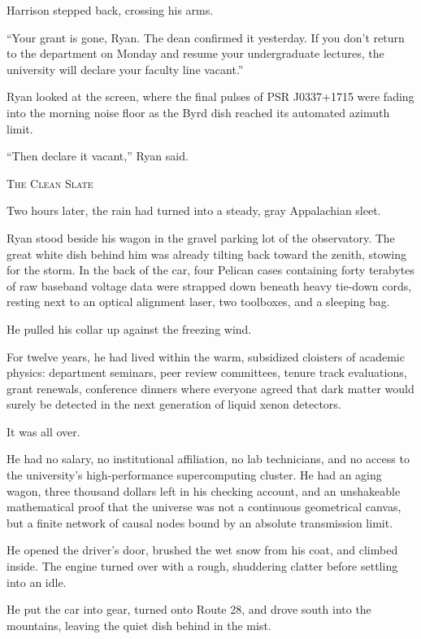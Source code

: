 \documentclass[12pt,twoside,openright]{book}
\newcommand{\sceneheader}[1]{%
  \par\vspace{1.8em}%
  {\noindent\centering\scshape\large #1\par}%
  \vspace{1.0em}%
  \noindent%
}
\newcommand{\dinkus}{%
  \par\vspace{1.2em}%
  {\noindent\centering{\large $\ast\quad\ast\quad\ast$}\par}%
  \vspace{1.2em}%
  \noindent%
}
\begin{document}
Harrison stepped back, crossing his arms.

``Your grant is gone, Ryan. The dean confirmed it yesterday. If you
don't return to the department on Monday and resume your undergraduate
lectures, the university will declare your faculty line vacant.''

Ryan looked at the screen, where the final pulses of PSR J0337+1715 were
fading into the morning noise floor as the Byrd dish reached its
automated azimuth limit.

``Then declare it vacant,'' Ryan said.

\dinkus

\sceneheader{The Clean Slate}

Two hours later, the rain had turned into a steady, gray Appalachian
sleet.

Ryan stood beside his wagon in the gravel parking lot of the
observatory. The great white dish behind him was already tilting back
toward the zenith, stowing for the storm. In the back of the car, four
Pelican cases containing forty terabytes of raw baseband voltage data
were strapped down beneath heavy tie-down cords, resting next to an
optical alignment laser, two toolboxes, and a sleeping bag.

He pulled his collar up against the freezing wind.

For twelve years, he had lived within the warm, subsidized cloisters of
academic physics: department seminars, peer review committees, tenure
track evaluations, grant renewals, conference dinners where everyone
agreed that dark matter would surely be detected in the next generation
of liquid xenon detectors.

It was all over.

He had no salary, no institutional affiliation, no lab technicians, and
no access to the university's high-performance supercomputing cluster.
He had an aging wagon, three thousand dollars left in his checking
account, and an unshakeable mathematical proof that the universe was not
a continuous geometrical canvas, but a finite network of causal nodes
bound by an absolute transmission limit.

He opened the driver's door, brushed the wet snow from his coat, and
climbed inside. The engine turned over with a rough, shuddering clatter
before settling into an idle.

He put the car into gear, turned onto Route 28, and drove south into the
mountains, leaving the quiet dish behind in the mist.
\end{document}
